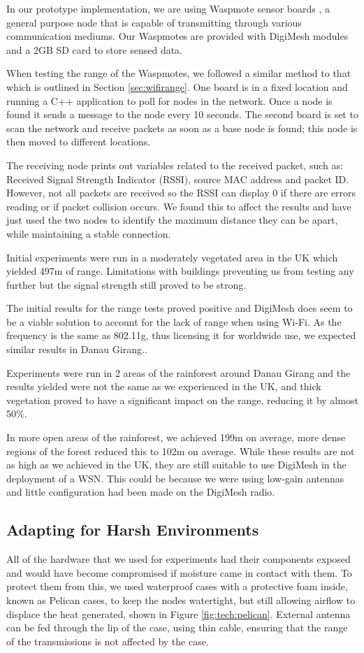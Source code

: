 In our prototype implementation, we are using Waspmote sensor boards \cite{Waspmote}, a general purpose node that is capable of transmitting through various communication mediums. Our Waspmotes are provided with DigiMesh modules and a 2GB SD card to store sensed data.
		
When testing the range of the Waspmotes, we followed a similar method to that which is outlined in Section \ref{sec:wifirange}. One board is in a fixed location and running a C++ application to poll for nodes in the network. Once a node is found it sends a message to the node every 10 seconds. The second board is set to scan the network and receive packets as soon as a base node is found; this node is then moved to different locations.
			
The receiving node prints out variables related to the received packet, such as: Received Signal Strength Indicator (RSSI), source MAC address and packet ID. However, not all packets are received so the RSSI can display 0 if there are errors reading or if packet collision occurs. We found this to affect the results and have just used the two nodes to identify the maximum distance they can be apart, while maintaining a stable connection.
					
Initial experiments were run in a moderately vegetated area in the UK which yielded 497m of range. Limitations with buildings preventing us from testing any further but the signal strength still proved to be strong.
			
The initial results for the range tests proved positive and DigiMesh does seem to be a viable solution to account for the lack of range when using Wi-Fi. As the frequency is the same as 802.11g, thus licensing it for worldwide use, we expected similar results in Danau Girang..
						
Experiments were run in 2 areas of the rainforest around Danau Girang and the results yielded were not the same as we experienced in the UK, and thick vegetation proved to have a significant impact on the range, reducing it by almost 50\%.
			
In more open areas of the rainforest, we achieved 199m on average, more dense regions of the forest reduced this to 102m on average. While these results are not as high as we achieved in the UK, they are still suitable to use DigiMesh in the deployment of a WSN. This could be because we were using low-gain antennas and little configuration had been made on the DigiMesh radio.

\subsection{Adapting for Harsh Environments}
	All of the hardware that we used for experiments had their components exposed and would have become compromised if moisture came in contact with them. To protect them from this, we used waterproof cases with a protective foam inside, known as Pelican cases, to keep the nodes watertight, but still allowing airflow to displace the heat generated, shown in Figure \ref{fig:tech:pelican}.
	External antenna can be fed through the lip of the case, using thin cable, ensuring that the range of the transmissions is not affected by the case. 

